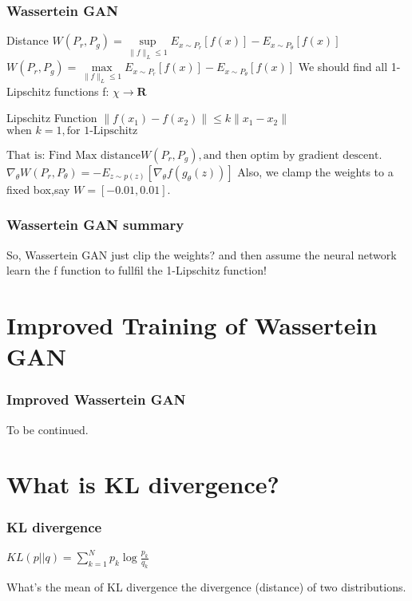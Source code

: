 \documentclass{beamer}[10]
\begin{document}
\begin{frame}
  \frametitle{Wassertein GAN}
  \begin{block}{Distance}
    $ W(P_r,P_g) = \sup \limits_{\|f\|_L \le 1} {E_{x \sim P_{r}}[f(x)] - E_{x \sim P_{\theta}}[f(x)] } $
    $ W(P_r,P_g) = \max \limits_{\|f\|_L \le 1} {E_{x \sim P_{r}}[f(x)] - E_{x \sim P_{\theta}}[f(x)] } $
    We should find all 1-Lipschitz functions f:  $\chi \to \textbf{R} $
    \begin{block}{Lipschitz Function}
    $ \|f(x_1) - f(x_2)\| \le  k \|x_1 - x_2 \| $   
    $ \mbox{when } k = 1, \mbox{for 1-Lipschitz} $
    \end{block}
    $ \mbox{That is: Find Max distance}W(P_r,P_g), 
    \mbox{and then optim by gradient descent}. $
    $ \nabla_{\theta} W(P_r,P_\theta) = - E_{z \sim p(z)} [\nabla_{\theta} f(g_{\theta}(z)) ] $
    Also, we clamp the weights to a fixed box,say $W = [-0.01,0.01 ]$.
  \end{block}
\end{frame}

\begin{frame}
  \frametitle{Wassertein GAN summary}
  So, Wassertein GAN just clip the weights? and then assume the neural network learn the f function to fullfil the 1-Lipschitz function!
\end{frame}

\section{Improved Training of Wassertein GAN}
\begin{frame}
  \frametitle{Improved Wassertein GAN}
  \begin{block}
    To be continued.
  \end{block}
\end{frame}


\section{What is KL divergence?}
\begin{frame}
  \frametitle{KL divergence}
  \begin{definition}
   $KL(p||q) = \sum_{k=1}^{N} p_k \log \frac{p_k}{q_k} $
  \end{definition}

  \begin{block}{What's the mean of KL divergence}
     the divergence (distance) of two distributions. 
  \end{block}
\end{frame}
\end{document}
